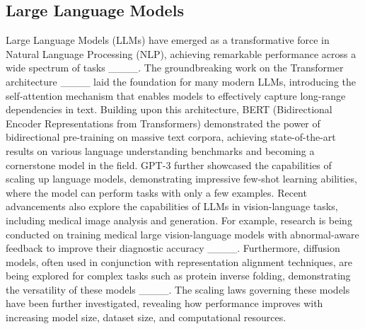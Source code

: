 \subsection{Large Language Models}

Large Language Models (LLMs) have emerged as a transformative force in Natural Language Processing (NLP), achieving remarkable performance across a wide spectrum of tasks ____. The groundbreaking work on the Transformer architecture ____ laid the foundation for many modern LLMs, introducing the self-attention mechanism that enables models to effectively capture long-range dependencies in text. Building upon this architecture, BERT (Bidirectional Encoder Representations from Transformers) demonstrated the power of bidirectional pre-training on massive text corpora, achieving state-of-the-art results on various language understanding benchmarks and becoming a cornerstone model in the field. GPT-3 further showcased the capabilities of scaling up language models, demonstrating impressive few-shot learning abilities, where the model can perform tasks with only a few examples.  Recent advancements also explore the capabilities of LLMs in vision-language tasks, including medical image analysis and generation. For example, research is being conducted on training medical large vision-language models with abnormal-aware feedback to improve their diagnostic accuracy ____.  Furthermore, diffusion models, often used in conjunction with representation alignment techniques, are being explored for complex tasks such as protein inverse folding, demonstrating the versatility of these models ____. The scaling laws governing these models have been further investigated, revealing how performance improves with increasing model size, dataset size, and computational resources.

